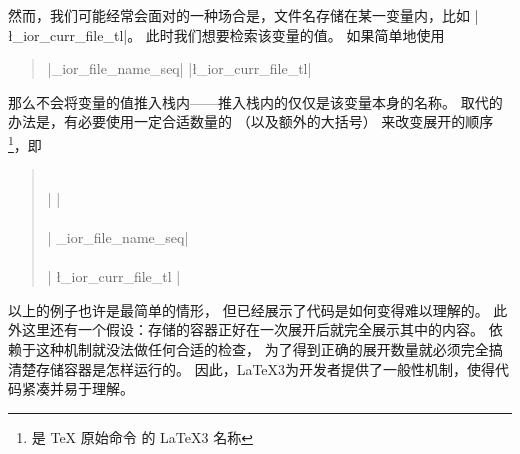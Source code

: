 \documentclass{l3doc}
\begin{document}
%
然而，我们可能经常会面对的一种场合是，文件名存储在某一变量内，比如 |\l_ior_curr_file_tl|。
此时我们想要检索该变量的值。
如果简单地使用
\begin{quote}
     |\g_ior_file_name_seq| |\l_ior_curr_file_tl|
\end{quote}
那么不会将变量的值推入栈内——推入栈内的仅仅是该变量本身的名称。
取代的办法是，有必要使用一定合适数量的 （以及额外的大括号）
来改变展开的顺序\footnote{
 是 \TeX{} 原始命令  的 \LaTeX3 名称}，即
\begin{quote}
                              \\
|   |                         \\
                              \\
|   \g_ior_file_name_seq|                      \\
                              \\
|   { \l_ior_curr_file_tl }|
\end{quote}

%
以上的例子也许是最简单的情形，
但已经展示了代码是如何变得难以理解的。
此外这里还有一个假设：存储的容器正好在一次展开后就完全展示其中的内容。
依赖于这种机制就没法做任何合适的检查，
为了得到正确的展开数量就必须完全搞清楚存储容器是怎样运行的。
因此，\LaTeX3为开发者提供了一般性机制，使得代码紧凑并易于理解。
\end{document}
